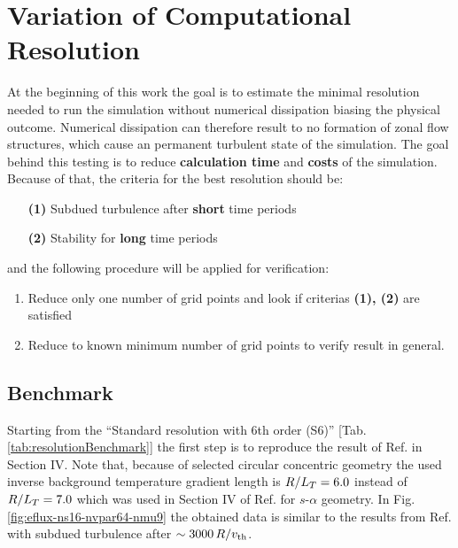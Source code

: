 \section{Variation of Computational Resolution}
\label{sec:variationsofresolution}

At the beginning of this work the goal is to estimate the minimal resolution needed to run the simulation without numerical dissipation biasing the physical outcome. Numerical dissipation can therefore result to no formation of zonal flow structures, which cause an permanent turbulent state of the simulation. The goal behind this testing is to reduce \textbf{calculation time} and \textbf{costs} of the simulation. \\
Because of that, the criteria for the best resolution should be:
\begin{enumerate}
	\item[\textbf{(1)}] Subdued turbulence after \textbf{short} time periods
	\item[\textbf{(2)}] Stability for \textbf{long} time periods 
\end{enumerate}
and the following procedure will be applied for verification:
\begin{enumerate}
	\item Reduce only one number of grid points and look if criterias \textbf{(1), (2)} are satisfied
	\item Reduce to known minimum number of grid points to verify result in general.
\end{enumerate}

\subsection{Benchmark}
\label{sub:benchmark}

Starting from the \enquote{Standard resolution with 6th order (S6)} [Tab. \ref{tab:resolutionBenchmark}] the first step is to reproduce the result of Ref.  in Section IV. Note that, because of selected circular concentric geometry the used inverse background temperature gradient length is $R/L_T = 6.0$ instead of $R/L_T = 7.0$ which was used in Section IV of Ref.  for $s$-$\alpha$ geometry. In Fig. \ref{fig:eflux-ns16-nvpar64-nmu9} the obtained data is similar to the results from Ref.  with subdued turbulence after $\sim 3000\,R/v_{\mathrm{th}}$. 


